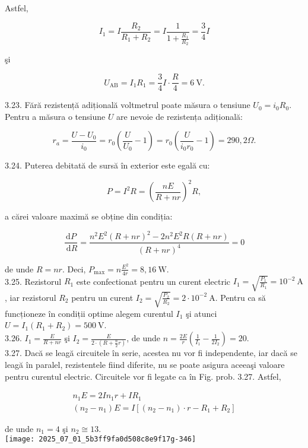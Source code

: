 Astfel,

$$
I_{1}=I \frac{R_{2}}{R_{1}+R_{2}}=I \frac{1}{1+\frac{R_{1}}{R_{2}}}=\frac{3}{4} I
$$

şi

$$
U_{\mathrm{AB}}=I_{1} R_{1}=\frac{3}{4} I \cdot \frac{R}{4}=6 \mathrm{~V} .
$$

3.23. Fără rezistență adițională voltmetrul poate măsura o tensiune $U_{0}=i_{0} R_{0}$. Pentru a măsura o tensiune $U$ are nevoie de rezistența adițională:

$$
r_{a}=\frac{U-U_{0}}{i_{0}}=r_{0}\left(\frac{U}{U_{0}}-1\right)=r_{0}\left(\frac{U}{i_{0} r_{0}}-1\right)=290,2 \Omega .
$$

3.24. Puterea debitată de sursă în exterior este egală cu:

$$
P=I^{2} R=\left(\frac{n E}{R+n r}\right)^{2} R,
$$

a cărei valoare maximă se obține din condiția:

$$
\frac{\mathrm{d} P}{\mathrm{~d} R}=\frac{n^{2} E^{2}(R+n r)^{2}-2 n^{2} E^{2} R(R+n r)}{(R+n r)^{4}}=0
$$

de unde $R=n r$. Deci, $P_{\max }=n \frac{E^{2}}{4 r}=8,16 \mathrm{~W}$.\\
3.25. Rezistorul $R_{1}$ este confectionat pentru un curent electric $I_{1}=\sqrt{\frac{P_{1}}{R_{1}}}=10^{-2} \mathrm{~A}$, iar rezistorul $R_{2}$ pentru un curent $I_{2}=\sqrt{\frac{P_{2}}{R_{2}}}=2 \cdot 10^{-2} \mathrm{~A}$. Pentru ca să funcționeze în condiții optime alegem curentul $I_{1}$ şi atunci $U=I_{1}\left(R_{1}+R_{2}\right)=500 \mathrm{~V}$.\\
3.26. $I_{1}=\frac{E}{R+n r}$ şi $I_{2}=\frac{E}{2 \cdot\left(R+\frac{n}{2} r\right)}$, de unde $n=\frac{2 E}{r}\left(\frac{1}{I_{1}}-\frac{1}{2 I_{2}}\right)=20$.\\
3.27. Dacă se leagă circuitele în serie, acestea nu vor fi independente, iar dacă se leagă în paralel, rezistentele fiind diferite, nu se poate asigura aceeaşi valoare pentru curentul electric. Circuitele vor fi legate ca în Fig. prob. 3.27. Astfel,

$$
\begin{gathered}
n_{1} E=2 I n_{1} r+I R_{1} \\
\left(n_{2}-n_{1}\right) E=I\left[\left(n_{2}-n_{1}\right) \cdot r-R_{1}+R_{2}\right]
\end{gathered}
$$

de unde $n_{1}=4$ şi $n_{2} \cong 13$.\\
\texttt{[image: 2025\_07\_01\_5b3ff9fa0d508c8e9f17g-346]}

